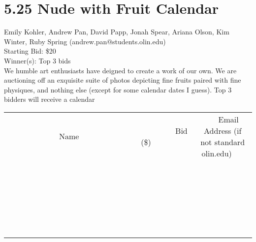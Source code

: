 \documentclass[11pt]{article}
\begin{document}
\section*{5.25 Nude with Fruit Calendar}
Emily Kohler, Andrew Pan, David Papp, Jonah Spear, Ariana Olson, Kim Winter, Ruby Spring (andrew.pan@students.olin.edu) \\
Starting Bid: \$20 \\
Winner(s): 
Top 3 bids \\
We humble art enthusiasts have deigned to create a work of our own.  We are auctioning off an exquisite suite of photos depicting fine fruits paired with fine physiques, and nothing else (except for some calendar dates I guess).  Top 3 bidders will receive a calendar \\[6ex]
\begin{tabular}{c c c}
~~~~~~~~~~~~~Name~~~~~~~~~~~~~ & ~~~~~~~~~Bid (\$)~~~~~~~~~ & ~~~Email Address (if not standard olin.edu)~~~ \\
 & & \\
\hline
 & & \\
\hline
 & & \\
\hline
 & & \\
\hline
 & & \\
\hline
 & & \\
\hline
 & & \\
\hline
 & & \\
\hline
 & & \\
\hline
 & & \\
\hline
 & & \\
\hline
 & & \\
\hline
 & & \\
\hline
 & & \\
\hline
 & & \\
\hline
 & & \\
\hline
 & & \\
\hline
 & & \\
\hline
 & & \\
\hline
 & & \\
\hline
 & & \\
\hline
 & & \\
\hline
 & & \\
\hline
 & & \\
\hline
 & & \\
\hline
 & & \\
\hline
\end{tabular}
\clearpage
\end{document}
